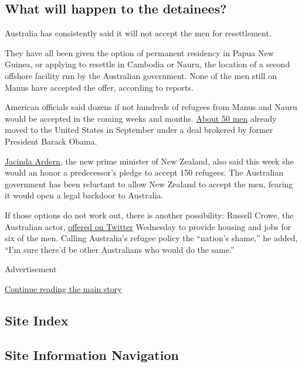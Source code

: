 \hypertarget{what-will-happen-to-the-detainees}{%
\subsection{What will happen to the
detainees?}\label{what-will-happen-to-the-detainees}}

Australia has consistently said it will not accept the men for
resettlement.

They have all been given the option of permanent residency in Papua New
Guinea, or applying to resettle in Cambodia or Nauru, the location of a
second offshore facility run by the Australian government. None of the
men still on Manus have accepted the offer, according to reports.

American officials said dozens if not hundreds of refugees from Manus
and Nauru would be accepted in the coming weeks and months.
\href{https://www.nytimes3xbfgragh.onion/2017/09/20/world/australia/refugees-turnbull-trump.html}{About
50 men} already moved to the United States in September under a deal
brokered by former President Barack Obama.

\href{https://www.nytimes3xbfgragh.onion/2017/10/20/world/asia/jacinda-ardern-new-zealand.html?_r=0}{Jacinda
Ardern}, the new prime minister of New Zealand, also said this week she
would an honor a predecessor's pledge to accept 150 refugees. The
Australian government has been reluctant to allow New Zealand to accept
the men, fearing it would open a legal backdoor to Australia.

If those options do not work out, there is another possibility: Russell
Crowe, the Australian actor,
\href{https://twitter.com/russellcrowe/status/925660477371269120}{offered
on Twitter} Wednesday to provide housing and jobs for six of the men.
Calling Australia's refugee policy the ``nation's shame,'' he added,
``I'm sure there'd be other Australians who would do the same.''

Advertisement

\protect\hyperlink{after-bottom}{Continue reading the main story}

\hypertarget{site-index}{%
\subsection{Site Index}\label{site-index}}

\hypertarget{site-information-navigation}{%
\subsection{Site Information
Navigation}\label{site-information-navigation}}

